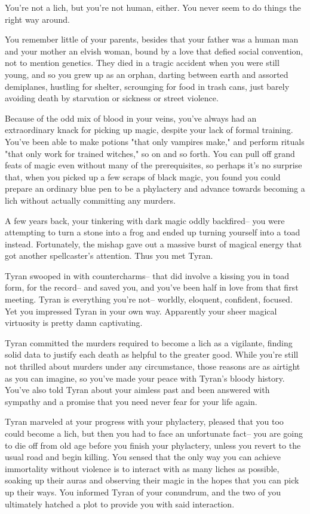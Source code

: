 \documentclass[char]{Sel}
\begin{document}
\name{\cCarminis{}}
You're not a lich, but you're not human, either. You never seem to do things the right way around.

You remember little of your parents, besides that your father was a human man and your mother an elvish woman, bound by a love that defied social convention, not to mention genetics. They died in a tragic accident when you were still young, and so you grew up as an orphan, darting between earth and assorted demiplanes, hustling for shelter, scrounging for food in trash cans, just barely avoiding death by starvation or sickness or street violence.

Because of the odd mix of blood in your veins, you've always had an extraordinary knack for picking up magic, despite your lack of formal training. You've been able to make potions "that only vampires make," and perform rituals "that only work for trained witches," so on and so forth. You can pull off grand feats of magic even without many of the prerequisites, so perhaps it's no surprise that, when you picked up a few scraps of black magic, you found you could prepare an ordinary blue pen to be a phylactery and advance towards becoming a lich without actually committing any murders.

A few years back, your tinkering with dark magic oddly backfired-- you were attempting to turn a stone into a frog and ended up turning yourself into a toad instead. Fortunately, the mishap gave out a massive burst of magical energy that got another spellcaster's attention. Thus you met Tyran.

Tyran swooped in with countercharms-- that did involve a kissing you in toad form, for the record-- and saved you, and you’ve been half in love from that first meeting. Tyran is everything you're not-- worldly, eloquent, confident, focused. Yet you impressed Tyran in your own way. Apparently your sheer magical virtuosity is pretty damn captivating.

Tyran committed the murders required to become a lich as a vigilante, finding solid data to justify each death as helpful to the greater good. While you're still not thrilled about murders under any circumstance, those reasons are as airtight as you can imagine, so you've made your peace with Tyran's bloody history. You've also told Tyran about your aimless past and been answered with sympathy and a promise that you need never fear for your life again.

Tyran marveled at your progress with your phylactery, pleased that you too could become a lich, but then you had to face an unfortunate fact-- you are going to die off from old age before you finish your phylactery, unless you revert to the usual road and begin killing. You sensed that the only way you can achieve immortality without violence is to interact with as many liches as possible, soaking up their auras and observing their magic in the hopes that you can pick up their ways. You informed Tyran of your conundrum, and the two of you ultimately hatched a plot to provide you with said interaction.
\end{document}
